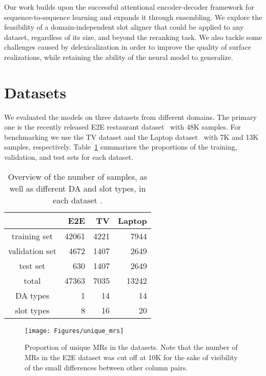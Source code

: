 \documentclass[11pt,a4paper]{article}
\begin{document}
Our work builds upon the successful attentional encoder-decoder framework for sequence-to-sequence learning and expands it through ensembling. We explore the feasibility of a domain-independent slot aligner that could be applied to any dataset, regardless of its size, and beyond the reranking task. We also tackle some challenges caused by delexicalization in order to improve the quality of surface realizations, while retaining the ability of the neural model to generalize.



\section{Datasets}
\label{sec:datasets}


We evaluated the models on three datasets from different domains. The primary one is the recently released E2E restaurant dataset~\cite{novikova2017e2e} with 48K samples. For benchmarking we use the TV dataset and the Laptop dataset~\cite{wen2016multi} with 7K and 13K samples, respectively. Table~\ref{table:dataset_overview} summarizes the proportions of the training, validation, and test sets for each dataset.

\begin{table}
  \small
  \centering
  \begin{tabular}{c r r r}
    \toprule
    & \textbf{E2E}	& \textbf{TV}	& \textbf{Laptop} \\
    \midrule
    training set		& 42061	& 4221	& 7944 \\
    validation set	& 4672	& 1407	& 2649 \\
    test set			& 630	& 1407	& 2649 \\
    total					& 47363	& 7035	& 13242 \\
    \midrule
    DA types	& 1		& 14	& 14 \\
    slot types	& 8		& 16	& 20 \\
    \bottomrule
  \end{tabular}
  \vspace{-0.1cm}
  \caption{Overview of the number of samples, as well as different DA and slot types, in each dataset
  \label{table:dataset_overview}.}
  \vspace{-0.2cm}
\end{table}

\begin{figure}
  \begin{center}
  	\texttt{[image: Figures/unique\_mrs]}
  \end{center}
  \vspace{-0.5cm}
  \caption{Proportion of unique MRs in the datasets. Note that the number of MRs in the E2E dataset was cut off at 10K for the sake of visibility of the small differences between other column pairs.}
  \label{fig:unique_mrs}
  \vspace{-0.2cm}
\end{figure}
\end{document}
